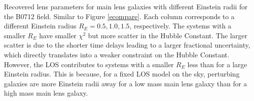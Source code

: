 \label{recompare} Recovered lens parameters for main lens galaxies with different Einstein radii for the B0712 field. Similar to Figure \ref{ecompare}. Each column corresponds to a different Einstein radius $R_E = 0.5,1.0,1.5$, respectively. The systems with a smaller $R_E$ have smaller $\chi^2$ but more scatter in the Hubble Constant. The larger scatter is due to the shorter time delays leading to a larger fractional uncertainty, which directly translates into a weaker constraint on the Hubble Constant. However, the LOS contributes to systems with a smaller $R_E$ less than for a large Einstein radius. This is because, for a fixed LOS model on the sky, perturbing galaxies are more Einstein radii away for a low mass main lens galaxy than for a high mass main lens galaxy. 